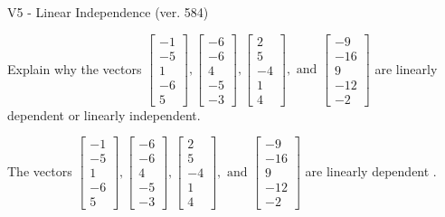 \begin{exercise}
  \begin{exerciseTitle}V5 - Linear Independence (ver. 584)\end{exerciseTitle}
  \begin{exerciseStatement}
    Explain why the vectors \(\left[\begin{array}{r}
-1 \\
-5 \\
1 \\
-6 \\
5
\end{array}\right] , \left[\begin{array}{r}
-6 \\
-6 \\
4 \\
-5 \\
-3
\end{array}\right] , \left[\begin{array}{r}
2 \\
5 \\
-4 \\
1 \\
4
\end{array}\right] , \text{ and } \left[\begin{array}{r}
-9 \\
-16 \\
9 \\
-12 \\
-2
\end{array}\right]\) are linearly dependent or linearly independent.	


  \end{exerciseStatement}
  \begin{exerciseAnswer}
   The vectors \(\left[\begin{array}{r}
-1 \\
-5 \\
1 \\
-6 \\
5
\end{array}\right] , \left[\begin{array}{r}
-6 \\
-6 \\
4 \\
-5 \\
-3
\end{array}\right] , \left[\begin{array}{r}
2 \\
5 \\
-4 \\
1 \\
4
\end{array}\right] , \text{ and } \left[\begin{array}{r}
-9 \\
-16 \\
9 \\
-12 \\
-2
\end{array}\right]\) are 
  	 linearly dependent  .
  


  \end{exerciseAnswer}
\end{exercise}